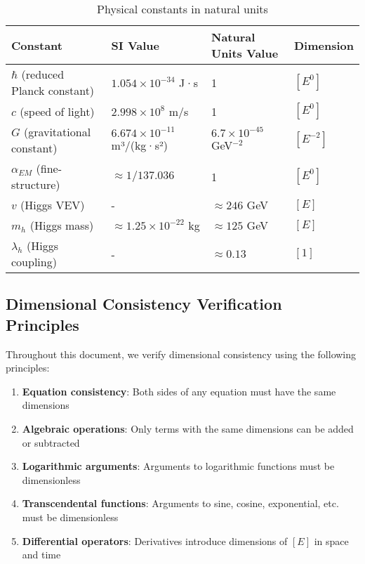 \documentclass[12pt,a4paper]{article}
\begin{document}
	\begin{table}[htbp]
		\footnotesize
		\centering
		\begin{tabular}{p{5cm}p{4.5cm}p{5.5cm}p{1.5cm}}
			\toprule
			\textbf{Constant} & \textbf{SI Value} & \textbf{Natural Units Value} & \textbf{Dimension} \\
			\midrule
			$\hbar$ (reduced Planck constant) & $1.054 \times 10^{-34}$ J·s & 1 & $[E^0]$ \\
			$c$ (speed of light) & $2.998 \times 10^8$ m/s & 1 & $[E^0]$ \\
			$G$ (gravitational constant) & $6.674 \times 10^{-11}$ m³/(kg·s²) & $6.7 \times 10^{-45}$ GeV$^{-2}$ & $[E^{-2}]$ \\
			$\alpha_{EM}$ (fine-structure) & $\approx 1/137.036$ & 1 & $[E^0]$ \\
			$v$ (Higgs VEV) & - & $\approx 246$ GeV & $[E]$ \\
			$m_h$ (Higgs mass) & $\approx 1.25 \times 10^{-22}$ kg & $\approx 125$ GeV & $[E]$ \\
			$\lambda_h$ (Higgs coupling) & - & $\approx 0.13$ & $[1]$ \\
			\bottomrule
		\end{tabular}
		\caption{Physical constants in natural units}
	\end{table}
	
	\subsection{Dimensional Consistency Verification Principles}
	
	Throughout this document, we verify dimensional consistency using the following principles:
	
	\begin{enumerate}
		\item \textbf{Equation consistency}: Both sides of any equation must have the same dimensions
		\item \textbf{Algebraic operations}: Only terms with the same dimensions can be added or subtracted
		\item \textbf{Logarithmic arguments}: Arguments to logarithmic functions must be dimensionless
		\item \textbf{Transcendental functions}: Arguments to sine, cosine, exponential, etc. must be dimensionless
		\item \textbf{Differential operators}: Derivatives introduce dimensions of $[E]$ in space and time
	\end{enumerate}
	
\end{document}
